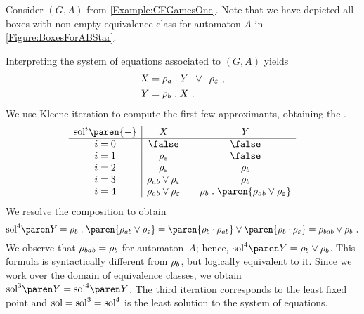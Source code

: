 \documentclass[../../diss.tex]{subfiles}
\begin{document}
\begin{example}%
\label{Example:CFGamesTwo}%
    Consider $(G,A)$ from \cref{Example:CFGamesOne}.
    Note that we have depicted all boxes with non-empty equivalence class for automaton $A$ in \cref{Figure:BoxesForABStar}.

    Interpreting the system of equations associated to $(G,A)$ yields
    \begin{align*}
        X &= \tbox{a} \comp Y \enspace \vee \enspace \tbox{\eps}
        \ ,
        \\
        Y &= \tbox{b} \comp X
        \ .
    \end{align*}
    We use Kleene iteration to compute the first few approximants, obtaining the .
    \[
        \begin{array}{c|c@{\hskip 2em}c}
            \soli{i}\paren{-} & X & Y
            \\
            \hline
            i = 0 & \false & \false
            \\
            i = 1 & \tbox{\eps} & \false
            \\
            i = 2 & \tbox{\eps} & \tbox{b}
            \\
            i = 3 & \tbox{ab} \vee \tbox{\eps} & \tbox{b}
            \\
            i = 4 & \tbox{ab} \vee \tbox{\eps} & \tbox{b} \comp \paren{ \tbox{ab} \vee \tbox{\eps} }
        \end{array}
    \]
%
    We resolve the composition to obtain
    \[
        \sol{4}{Y}
        = \tbox{b} \comp \paren{ \tbox{ab} \vee \tbox{\eps} }
        = \paren{ \tbox{b} \cdot \tbox{ab} } \vee \paren{ \tbox{b} \cdot \tbox{\eps} } = \tbox{bab} \vee \tbox{b}
        \ .
    \]
    We observe that $\tbox{bab} = \tbox{b}$ for automaton~$A$; hence, $\sol{4}{Y} = \tbox{b} \vee \tbox{b}$.
    This formula is syntactically different from $\tbox{b}$, but logically equivalent to it.
    Since we work over the domain of equivalence classes, we obtain $\sol{3}{Y} = \sol{4}{Y}$.
    The third iteration corresponds to the least fixed point and $\sol = \soli{3} = \soli{4}$ is the least solution to the system of equations.
\end{example}
\end{document}

